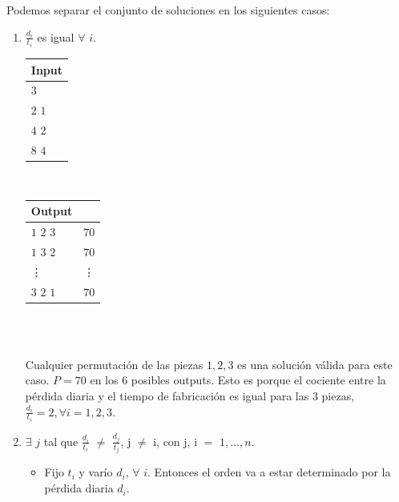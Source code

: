 \documentclass[11pt, a4paper, twoside]{article}
\begin{document}
Podemos separar el conjunto de soluciones en los siguientes casos: 
\begin{enumerate}
    \item $\frac{d_i}{t_i}$ es igual  $\forall$ $i$. 
	
		\begin{minipage}{0.2\textwidth}
			\begin{tabular}{l}
				Input  \\
				\hline
				$3$   \\
				$2$ $1$ \\
				$4$ $2$ \\
				$8$ $4$ 
			\end{tabular} \\ 
		\end{minipage}
		\begin{minipage}{0.2\textwidth}
			\begin{tabular}{ll}
				Output  \\
				\hline
				$1$   $2$  $3$ & $70$ \\
				$1$   $3$  $2$ & $70$ \\
				\vdots         & \vdots\\
				$3$   $2$  $1$ & $70$ \\
			\end{tabular} \\ 
		\end{minipage}  \\
		\textnormal{Cualquier permutación de las piezas $1,2,3$ es una solución válida para este caso. $P=70$ en los $6$ posibles outputs. Esto es porque el cociente entre la pérdida diaria y el tiempo de fabricación es igual para las $3$ piezas, $\frac{d_i}{t_i}=2, \forall i = 1,2,3$.} \\

	\item $\exists$ $j$ tal que $\frac{d_i}{t_i}$ $\ne$ $\frac{d_j}{t_j}$, j $\ne$ i, con j, i $=$ $1,...,n$. 
	
	\begin{itemize}
		\item Fijo $t_i$ y varío $d_i$, $\forall$ $i$. Entonces el orden va a estar determinado por la pérdida diaria $d_i$.
		

\end{itemize}
\end{enumerate}
\end{document}
